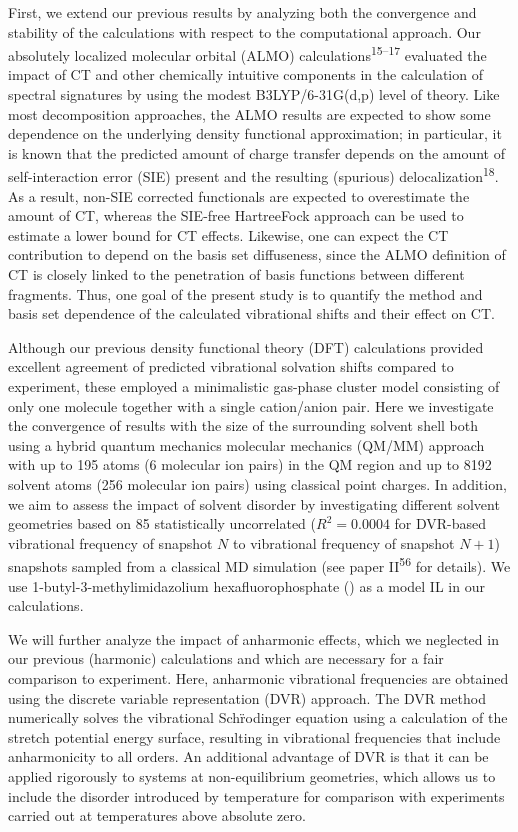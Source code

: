 First, we extend our previous results by analyzing both the convergence and stability of the calculations with respect to the computational approach. Our absolutely localized molecular orbital (ALMO) calculations\textsuperscript{15--17} evaluated the impact of CT and other chemically intuitive components in the calculation of spectral signatures by using the modest B3LYP/6-31G(d,p) level of theory. Like most decomposition approaches, the ALMO results are expected to show some dependence on the underlying density functional approximation; in particular, it is known that the predicted amount of charge transfer depends on the amount of self-interaction error (SIE) present and the resulting (spurious) delocalization\textsuperscript{18}. As a result, non-SIE corrected functionals are expected to overestimate the amount of CT, whereas the SIE-free Hartree\textendash{}Fock approach can be used to estimate a lower bound for CT effects. Likewise, one can expect the CT contribution to depend on the basis set diffuseness, since the ALMO definition of CT is closely linked to the penetration of basis functions between different fragments. Thus, one goal of the present study is to quantify the method and basis set dependence of the calculated vibrational shifts and their effect on CT.

Although our previous density functional theory (DFT) calculations provided excellent agreement of predicted vibrational solvation shifts compared to experiment, these employed a minimalistic gas-phase cluster model consisting of only one  molecule together with a single cation/anion pair. Here we investigate the convergence of results with the size of the surrounding solvent shell both using a hybrid quantum mechanics molecular mechanics (QM/MM) approach with up to \num{195} atoms (\num{6} molecular ion pairs) in the QM region and up to \num{8192} solvent atoms (\num{256} molecular ion pairs) using classical point charges. In addition, we aim to assess the impact of solvent disorder by investigating different solvent geometries based on \num{85} statistically uncorrelated (\(R^2 = 0.0004\) for DVR-based vibrational frequency of snapshot \(N\) to vibrational frequency of snapshot \(N+1\)) snapshots sampled from a classical MD simulation (see paper II\textsuperscript{56} for details). We use 1-butyl-3-methylimidazolium hexafluorophosphate (\ce{[C4C1im][PF6]}) as a model IL in our calculations.

We will further analyze the impact of anharmonic effects, which we neglected in our previous (harmonic) calculations and which are necessary for a fair comparison to experiment. Here, anharmonic vibrational frequencies are obtained using the discrete variable representation (DVR) approach. The DVR method numerically solves the vibrational Schr\"{}odinger equation using a calculation of the  stretch potential energy surface, resulting in vibrational frequencies that include anharmonicity to all orders. An additional advantage of DVR is that it can be applied rigorously to systems at non-equilibrium geometries, which allows us to include the disorder introduced by temperature for comparison with experiments carried out at temperatures above absolute zero.

